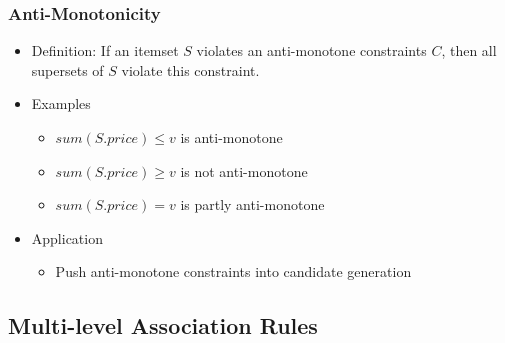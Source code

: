 \documentclass[../notes.tex]{subfiles}
\begin{document}
\subsubsection{Anti-Monotonicity}
\begin{itemize}
  \item Definition: If an itemset $S$ violates an anti-monotone constraints $C$, then all supersets of $S$ violate this constraint.
  \item Examples
    \begin{itemize}
      \item $sum(S.price) \le v$ is anti-monotone
      \item $sum(S.price) \ge v$ is not anti-monotone
      \item $sum(S.price) = v$ is partly anti-monotone
    \end{itemize}
  \item Application
    \begin{itemize}
      \item Push anti-monotone constraints into candidate generation
    \end{itemize}
\end{itemize} 

\subsection{Multi-level Association Rules}
\end{document}

